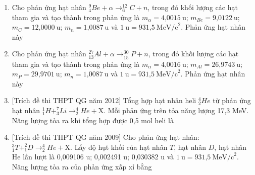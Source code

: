 \begin{enumerate}
	\item {Cho phản ứng hạt nhân $^9_4 Be + \alpha \longrightarrow ^{12}_6 C + n$, trong đó khối lượng các hạt tham gia và tạo thành trong phản ứng là $m_{\alpha} = \text{4,0015}\ \text{u}$; $m_{Be} = \text{9,0122}\ \text{u}$; $m_C =\text{12,0000}\ \text{u}$; $m_n = \text{1,0087}\ \text{u}$ và $1\ \text{u} =\text{931,5}\ \text{MeV/c}^2$. Phản ứng hạt nhân này
	}
	\item{Cho phản ứng hạt nhân $^{27}_{13} Al +\alpha \longrightarrow ^{30}_{15}P +n$, trong đó khối lượng các hạt tham gia và tạo thành trong phản ứng là $m_{\alpha} =\text{4,0016}\ \text{u}$; $m_{Al} =\text{26,9743}\ \text{u}$; $m_P=\text{29,9701}\ \text{u}$; $m_n=\text{1,0087}\ \text{u}$ và $1\ \text{u} =\text{931,5}\ \text{MeV/c}^2$. Phản ứng hạt nhân này
	}
	\item {[Trích đề thi THPT QG năm 2012] Tổng hợp hạt nhân heli $^4_2 He$ từ phản ứng hạt nhân $^1_1 H + ^7_3Li \longrightarrow ^4_2 He + \text{X}$. Mỗi phản ứng trên tỏa năng lượng 17,3 MeV. Năng lượng tỏa ra khi tổng hợp được 0,5 mol heli là
	}
	\item{[Trích đề thi THPT QG năm 2009] Cho phản ứng hạt nhân: $^3_1T+^2_1D \longrightarrow ^4_2He + \text{X}$. Lấy độ hụt khối của hạt nhân $T$, hạt nhân $D$, hạt nhân He lần lượt là 0,009106 u; 0,002491 u; 0,030382 u và $1\ \text{u} =\text{931,5}\ \text{MeV/c}^2$. Năng lượng tỏa ra của phản ứng xấp xỉ bằng
}
\end{enumerate}
